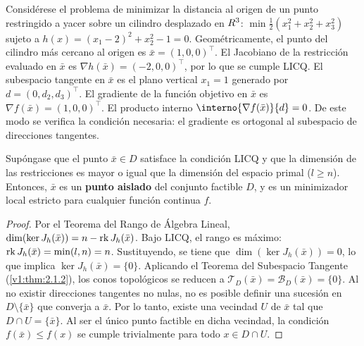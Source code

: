 \begin{example}\label{v1:exa:2.1.4}
 Considérese el problema de minimizar la distancia al origen de un punto restringido a yacer sobre un cilindro desplazado en $R^3$: $\min \frac{1}{2}(x_1^2 + x_2^2 + x_3^2)$ sujeto a $h(x) = (x_1 - 2)^2 + x_2^2 - 1 = 0$. Geométricamente, el punto del cilindro más cercano al origen es $\bar{x} = (1, 0, 0)^\top$. El Jacobiano de la restricción evaluado en $\bar{x}$ es $\nabla h(\bar{x}) = (-2, 0, 0)^\top$, por lo que se cumple LICQ. El subespacio tangente en $\bar{x}$ es el plano vertical $x_1 = 1$ generado por $d = (0, d_2, d_3)^\top$. El gradiente de la función objetivo en $\bar{x}$ es $\nabla f(\bar{x}) = (1, 0, 0)^\top$. El producto interno $\interno{\nabla f(\bar{x})}{d} = 0$. De este modo se verifica la condición necesaria: el gradiente es ortogonal al subespacio de direcciones tangentes.
\end{example}

\begin{corollary}\label{v1:cor:2.1.1}
 Supóngase que el punto $\bar{x} \in D$ satisface la condición LICQ y que la dimensión de las restricciones es mayor o igual que la dimensión del espacio primal ($l \ge n$). Entonces, $\bar{x}$ es un \textbf{punto aislado} del conjunto factible $D$, y es un minimizador local estricto para cualquier función continua $f$.
\end{corollary}

\begin{proof}
 Por el Teorema del Rango de Álgebra Lineal, $\dim(\ker J_h(\bar{x})) = n - \operatorname{rk} J_h(\bar{x})$. Bajo LICQ, el rango es máximo: $\operatorname{rk} J_h(\bar{x}) = \min(l, n) = n$. Sustituyendo, se tiene que $\dim(\ker J_h(\bar{x})) = 0$, lo que implica $\ker J_h(\bar{x}) = \{0\}$. Aplicando el Teorema del Subespacio Tangente (\cref{v1:thm:2.1.2}), los conos topológicos se reducen a $\mathcal{T}_D(\bar{x}) = \mathcal{B}_D(\bar{x}) = \{0\}$. Al no existir direcciones tangentes no nulas, no es posible definir una sucesión en $D \setminus \{\bar{x}\}$ que converja a $\bar{x}$. Por lo tanto, existe una vecindad $U$ de $\bar{x}$ tal que $D \cap U = \{\bar{x}\}$. Al ser el único punto factible en dicha vecindad, la condición $f(\bar{x}) \le f(x)$ se cumple trivialmente para todo $x \in D \cap U$.
\end{proof}